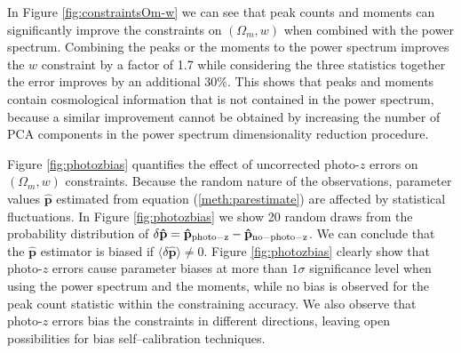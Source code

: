 \documentclass[reprint,aps,prd,superscriptaddress,showkeys,showpacs]{revtex4-1}
\newcommand{\bbh}[1]{\mathbf{\hat{#1}}}
\begin{document}
In Figure \ref{fig:constraintsOm-w} we can see that peak counts and moments can significantly improve the constraints on $(\Omega_m,w)$ when combined with the power spectrum. Combining the peaks or the moments to the power spectrum improves the $w$ constraint by a factor of 1.7 while considering the three statistics together the error improves by an additional $30\%$. This shows that peaks and moments contain cosmological information that is not contained in the power spectrum, because a similar improvement cannot be obtained by increasing the number of PCA components in the power spectrum dimensionality reduction procedure. 

Figure \ref{fig:photozbias} quantifies the effect of uncorrected photo-$z$ errors on $(\Omega_m,w)$ constraints. Because the random nature of the observations, parameter values $\bbh{p}$ estimated from equation (\ref{meth:parestimate}) are affected by statistical fluctuations. In Figure \ref{fig:photozbias} we show 20 random draws from the probability distribution of $\delta \bbh{p}=\bbh{p}_{\rm photo-z}-\bbh{p}_{\rm no-photo-z}$. We can conclude that the $\bbh{p}$ estimator is biased if $\langle\delta\bbh{p}\rangle\neq 0$. Figure \ref{fig:photozbias} clearly show that photo-$z$ errors cause parameter biases at more than $1\sigma$ significance level when using the power spectrum and the moments, while no bias is observed for the peak count statistic within the constraining accuracy. We also observe that photo-$z$ errors bias the constraints in different directions, leaving open possibilities for bias self--calibration techniques.         

\end{document}
